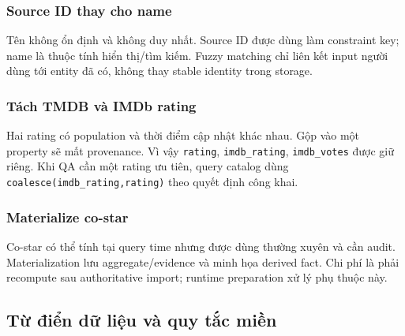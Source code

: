 \subsubsection{Source ID thay cho name}

Tên không ổn định và không duy nhất. Source ID được dùng làm constraint key; name
là thuộc tính hiển thị/tìm kiếm. Fuzzy matching chỉ liên kết input người dùng tới
entity đã có, không thay stable identity trong storage.

\subsubsection{Tách TMDB và IMDb rating}

Hai rating có population và thời điểm cập nhật khác nhau. Gộp vào một property sẽ
mất provenance. Vì vậy \texttt{rating}, \texttt{imdb\_rating}, \texttt{imdb\_votes} được giữ riêng. Khi
QA cần một rating ưu tiên, query catalog dùng \texttt{coalesce(imdb\_rating,rating)} theo quyết
định công khai.

\subsubsection{Materialize co-star}

Co-star có thể tính tại query time nhưng được dùng thường xuyên và cần audit.
Materialization lưu aggregate/evidence và minh họa derived fact. Chi phí là phải
recompute sau authoritative import; runtime preparation xử lý phụ thuộc này.

\subsection{Từ điển dữ liệu và quy tắc miền}

